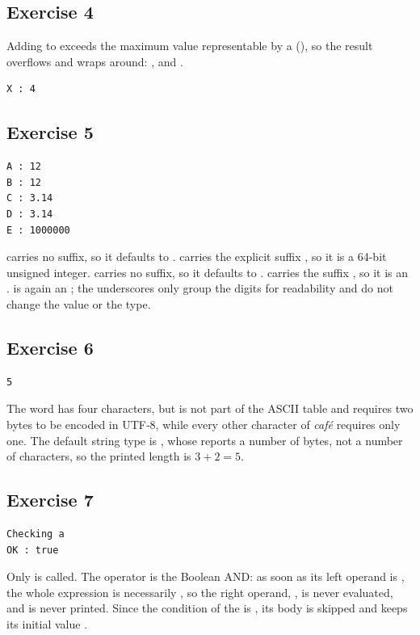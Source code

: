 \subsection*{Exercise 4}

Adding  to  exceeds the maximum value representable by a
 (), so the result overflows and wraps around:
, and .

\begin{lstlisting}[style=bashVerb]
X : 4
\end{lstlisting}

\subsection*{Exercise 5}

\begin{lstlisting}[style=bashVerb]
A : 12
B : 12
C : 3.14
D : 3.14
E : 1000000
\end{lstlisting}

 carries no suffix, so it defaults to .  carries
the explicit suffix , so it is a 64-bit unsigned integer.
 carries no suffix, so it defaults to .  carries
the suffix , so it is an .  is again an
; the underscores only group the digits for readability and do not
change the value or the type.

\subsection*{Exercise 6}

\begin{lstlisting}[style=bashVerb]
5
\end{lstlisting}

The word has four characters, but  is not part of the ASCII table
and requires two bytes to be encoded in UTF‑8, while every other character of
\textit{café} requires only one. The default string type is \token{[c8]},
whose  reports a number of bytes, not a number of characters, so
the printed length is $3 + 2 = 5$.

\subsection*{Exercise 7}

\begin{lstlisting}[style=bashVerb]
Checking a
OK : true
\end{lstlisting}

Only  is called. The \token{\&\&} operator is the
Boolean AND: as soon as its left operand is , the whole
expression is necessarily , so the right operand,
, is never evaluated, and  is
never printed. Since the condition of the  is , its
body is skipped and  keeps its initial value .
